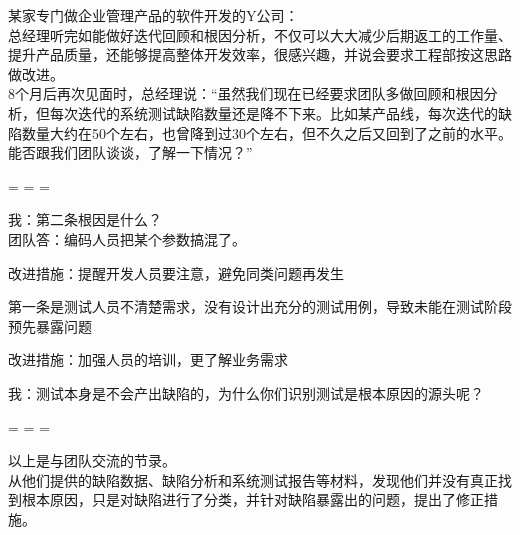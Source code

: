 某家专门做企业管理产品的软件开发的Y公司：\\
总经理听完如能做好迭代回顾和根因分析，不仅可以大大减少后期返工的工作量、提升产品质量，还能够提高整体开发效率，很感兴趣，并说会要求工程部按这思路做改进。\\
8个月后再次见面时，总经理说：``虽然我们现在已经要求团队多做回顾和根因分析，但每次迭代的系统测试缺陷数量还是降不下来。比如某产品线，每次迭代的缺陷数量大约在50个左右，也曾降到过30个左右，但不久之后又回到了之前的水平。能否跟我们团队谈谈，了解一下情况？''

\begin{description}
\tightlist
\item[]
= = =
\end{description}

我：第二条根因是什么？\\
团队答：编码人员把某个参数搞混了。

\begin{description}
\tightlist
\item[]
改进措施：提醒开发人员要注意，避免同类问题再发生
\end{description}

第一条是测试人员不清楚需求，没有设计出充分的测试用例，导致未能在测试阶段预先暴露问题

\begin{description}
\tightlist
\item[]
改进措施：加强人员的培训，更了解业务需求
\end{description}

我：测试本身是不会产出缺陷的，为什么你们识别测试是根本原因的源头呢？

\begin{description}
\tightlist
\item[]
= = =
\end{description}

以上是与团队交流的节录。\\
从他们提供的缺陷数据、缺陷分析和系统测试报告等材料，发现他们并没有真正找到根本原因，只是对缺陷进行了分类，并针对缺陷暴露出的问题，提出了修正措施。\\


